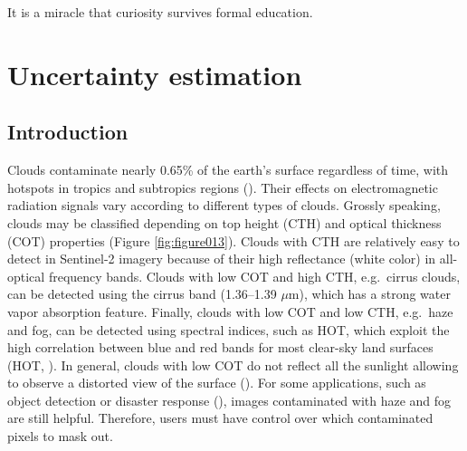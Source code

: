 \documentclass[a4paper, nobind]{templates/cdethesis}
\begin{document}
\begin{savequote}
It is a miracle that curiosity survives formal education.
\end{savequote}



\hypertarget{uncertainty-estimation}{%
\chapter{Uncertainty estimation}\label{uncertainty-estimation}}

\minitoc 

\hypertarget{introduction-1}{%
\section{Introduction}\label{introduction-1}}

Clouds contaminate nearly 0.65\% of the earth's surface regardless of time, with hotspots in tropics and subtropics regions (\cite{sassen2008classifying, winker2010calipso, Wilson2016}). Their effects on electromagnetic radiation signals vary according to different types of clouds. Grossly speaking, clouds may be classified depending on top height (CTH) and optical thickness (COT) properties (Figure \ref{fig:figure013}). Clouds with CTH are relatively easy to detect in Sentinel-2 imagery because of their high reflectance (white color) in all-optical frequency bands. Clouds with low COT and high CTH, e.g.~cirrus clouds, can be detected using the cirrus band (1.36--1.39 \(\mu\)m), which has a strong water vapor absorption feature. Finally, clouds with low COT and low CTH, e.g.~haze and fog, can be detected using spectral indices, such as HOT, which exploit the high correlation between blue and red bands for most clear-sky land surfaces (HOT, \cite{zhang2002}). In general, clouds with low COT do not reflect all the sunlight allowing to observe a distorted view of the surface (\cite{lynch2002cirrus, chen2017}). For some applications, such as object detection or disaster response (\cite{Mateo-Garcia2021}), images contaminated with haze and fog are still helpful. Therefore, users must have control over which contaminated pixels to mask out.
\end{document}
